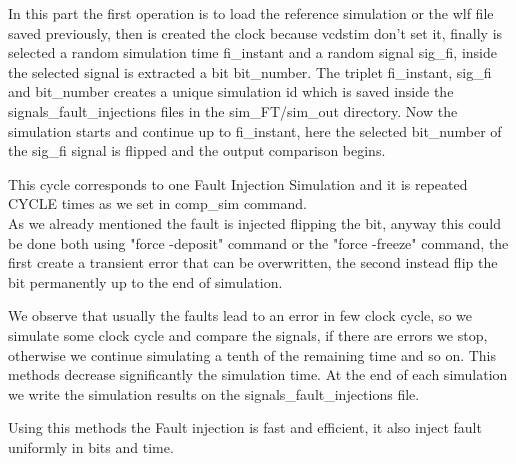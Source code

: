 {{{\begin{itemize}
                
                In this part the first operation is to load the reference simulation or the wlf file saved previously, then is created the clock because vcdstim don't set it, finally is selected a random simulation time fi\_instant and a random signal sig\_fi, inside the selected signal is extracted a bit bit\_number. The triplet fi\_instant, sig\_fi and bit\_number creates a unique simulation id which is saved inside the signals\_fault\_injections files in the sim\_FT/sim\_out directory.
                Now the simulation starts and continue up to fi\_instant, here the selected bit\_number of the sig\_fi signal is flipped and the output comparison begins. 
                
                This cycle corresponds to one Fault Injection Simulation and it is repeated CYCLE times as we set in comp\_sim command.\\
                
                As we already mentioned the fault is injected flipping the bit, anyway this could be done both using "force -deposit" command or the "force -freeze" command, the first create a transient error that can be overwritten, the second instead flip the bit permanently up to the end of simulation.
                
                We observe that usually the faults lead to an error in few clock cycle, so we simulate some clock cycle and compare the signals, if there are errors we stop, otherwise we continue simulating a tenth of the remaining time and so on. This methods decrease significantly the simulation time.
                At the end of each simulation we write the simulation results on the signals\_fault\_injections file.
            \end{itemize}
            
            Using this methods the Fault injection is fast and efficient, it also inject fault uniformly in bits and time.
        }
}}
